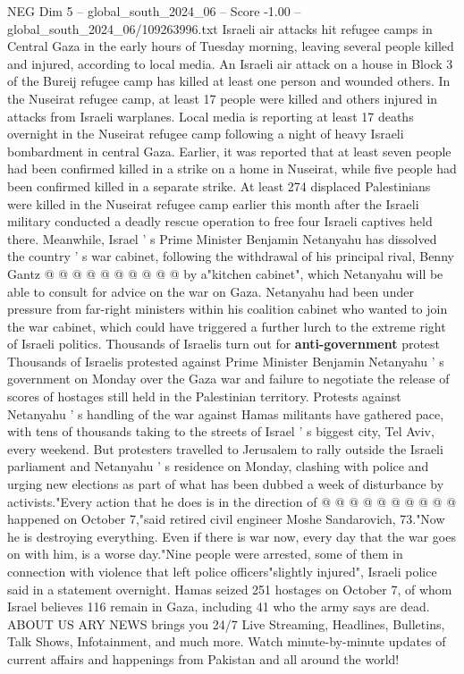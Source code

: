 \begin{textsample}{NEG Dim 5 – global\_south\_2024\_06 – Score -1.00 – global\_south\_2024\_06/109263996.txt}  \label{ex:f5_neg_223}
Israeli air attacks hit refugee camps in Central Gaza in the early hours of Tuesday morning, leaving several people killed and injured, according to local media.
An Israeli air attack on a house in Block 3 of the Bureij refugee camp has killed at least one person and wounded others.
In the Nuseirat refugee camp, at least 17 people were killed and others injured in attacks from Israeli warplanes.
Local media is reporting at least 17 deaths overnight in the Nuseirat refugee camp following a night of heavy Israeli bombardment in central Gaza.
Earlier, it was reported that at least seven people had been confirmed killed in a strike on a home in Nuseirat, while five people had been confirmed killed in a separate strike.
At least 274 displaced Palestinians were killed in the Nuseirat refugee camp earlier this month after the Israeli military conducted a deadly rescue operation to free four Israeli captives held there.
Meanwhile, Israel ' s Prime Minister Benjamin Netanyahu has dissolved the country ' s war cabinet, following the withdrawal of his principal rival, Benny Gantz @ @ @ @ @ @ @ @ @ @ by a"kitchen cabinet", which Netanyahu will be able to consult for advice on the war on Gaza.
Netanyahu had been under pressure from far-right ministers within his coalition cabinet who wanted to join the war cabinet, which could have triggered a further lurch to the extreme right of Israeli politics.
Thousands of Israelis turn out for \textbf{anti-government} protest Thousands of Israelis protested against Prime Minister Benjamin Netanyahu ' s government on Monday over the Gaza war and failure to negotiate the release of scores of hostages still held in the Palestinian territory.
Protests against Netanyahu ' s handling of the war against Hamas militants have gathered pace, with tens of thousands taking to the streets of Israel ' s biggest city, Tel Aviv, every weekend.
But protesters travelled to Jerusalem to rally outside the Israeli parliament and Netanyahu ' s residence on Monday, clashing with police and urging new elections as part of what has been dubbed a week of disturbance by activists."Every action that he does is in the direction of @ @ @ @ @ @ @ @ @ @ happened on October 7,"said retired civil engineer Moshe Sandarovich, 73."Now he is destroying everything.
Even if there is war now, every day that the war goes on with him, is a worse day."Nine people were arrested, some of them in connection with violence that left police officers"slightly injured", Israeli police said in a statement overnight.
Hamas seized 251 hostages on October 7, of whom Israel believes 116 remain in Gaza, including 41 who the army says are dead.
ABOUT US ARY NEWS brings you 24/7 Live Streaming, Headlines, Bulletins, Talk Shows, Infotainment, and much more.
Watch minute-by-minute updates of current affairs and happenings from Pakistan and all around the world!

\end{textsample}
